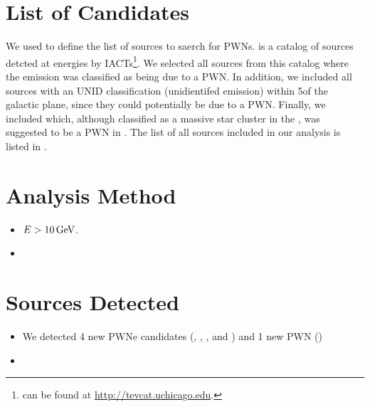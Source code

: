 \section{List of Candidates}

We used \tevcat to define the list of \tev sources to saerch for \gev
\acp{PWN}. \tevcat is a catalog of sources detcted at \tev energies by 
\acp{IACT}\footnote{\tevcat can be found at \url{http://tevcat.uchicago.edu}.}.
We selected all sources from this catalog 
where the emission was classified as being
due to a \ac{PWN}. In addition, we included all sources with an UNID classification
(unidientifed emission) within 5\degree of the galactic plane, since they
could potentially be due to a \ac{PWN}.
Finally, we included  which, although classified as a
massive star cluster in the \tevcat, was suggested to be a \ac{PWN} in 
\cite{de-naurois_2013a_galactic-h.e.s.s.}. The list of all sources
included in our analysis is listed in .



\section{Analysis Method}

\begin{itemize}
  \item $E>10\,\text{GeV}$.
  \item 
\end{itemize}

\section{Sources Detected}

\begin{itemize}
  \item
    We detected 4 new PWNe candidates (, ,
    ,
    and )
    and 1 new PWN ()
  \item
\end{itemize}
